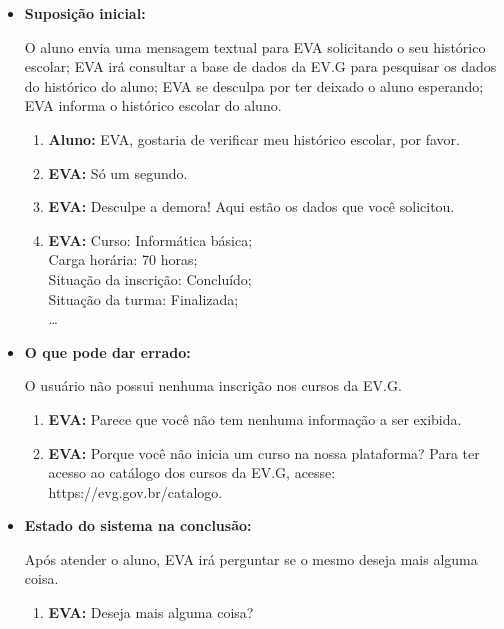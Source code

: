\begin{itemize}
    \item \textbf{Suposição inicial:}
    
        O aluno envia uma mensagem textual para EVA solicitando o seu histórico escolar; EVA irá consultar a base de dados da EV.G para pesquisar os dados do histórico do aluno; EVA se desculpa por ter deixado o aluno esperando; EVA informa o histórico escolar do aluno.
        
        \begin{enumerate}
            \item \textbf{Aluno:} EVA, gostaria de verificar meu histórico escolar, por favor.
            \item \textbf{EVA:} Só um segundo.
            \item \textbf{EVA:} Desculpe a demora! Aqui estão os dados que você solicitou.
            \item \textbf{EVA:} Curso: Informática básica; \\
            Carga horária: 70 horas; \\
            Situação da inscrição: Concluído; \\
            Situação da turma: Finalizada;\\ \ldots
        \end{enumerate}
    
    \item \textbf{O que pode dar errado:}
    
        O usuário não possui nenhuma inscrição nos cursos da EV.G.
        
        \begin{enumerate}
            \item \textbf{EVA:} Parece que você não tem nenhuma informação a ser exibida.
            \item \textbf{EVA:} Porque você não inicia um curso na nossa plataforma? Para ter acesso ao catálogo dos cursos da EV.G, acesse: https://evg.gov.br/catalogo.
\end{enumerate}
    
    \item \textbf{Estado do sistema na conclusão:}
    
        Após atender o aluno, EVA irá perguntar se o mesmo deseja mais alguma coisa.
        
        \begin{enumerate}
            \item \textbf{EVA:} Deseja mais alguma coisa?
        \end{enumerate}
    \end{itemize}

